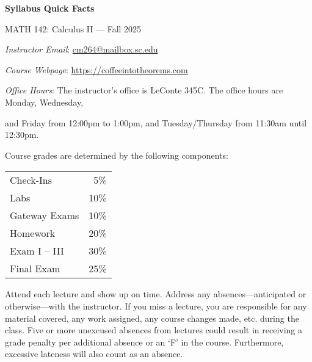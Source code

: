 \documentclass[11pt,letterpaper]{article}
\begin{document}
\begin{center} 
\bfseries
\color{scred}
\LARGE Syllabus Quick Facts \par\vspace{0.2\baselineskip}
\Large MATH 142: Calculus II --- Fall 2025
\end{center} \pspace


\hspace{0.53cm} {\itshape Instructor Email}: \href{mailto:cm264@mailbox.sc.edu}{cm264@mailbox.sc.edu} \par
\hspace{0.53cm} {\itshape Course Webpage}: \href{https://coffeeintotheorems.com}{https://coffeeintotheorems.com} \par
\hspace{0.53cm} {\itshape Office Hours}: The instructor's office is LeConte 345C. The office hours are Monday, Wednesday, \par \hspace{0.55cm} and Friday from 12:00pm to 1:00pm, and Tuesday/Thursday from 11:30am until 12:30pm. \pspace


Course grades are determined by the following components: \par \vspace{-0.3cm}
	\begin{table}[!ht]
        \begin{tabular}{lr}
	Check-Ins & 5\% \\
	Labs & 10\% \\
	Gateway Exams& 10\% \\
	Homework & 20\% \\
	Exam I -- III & 30\% \\
	Final Exam & 25\%
        \end{tabular} 
        \end{table}


Attend each lecture and show up on time. Address any absences---anticipated or otherwise---with the instructor. If you miss a lecture, you are responsible for any material covered, any work assigned, any course changes made, etc. during the class. Five or more unexcused absences from lectures could result in receiving a grade penalty per additional absence or an `F' in the course. Furthermore, excessive lateness will also count as an absence. 
\pspace
\end{document}
